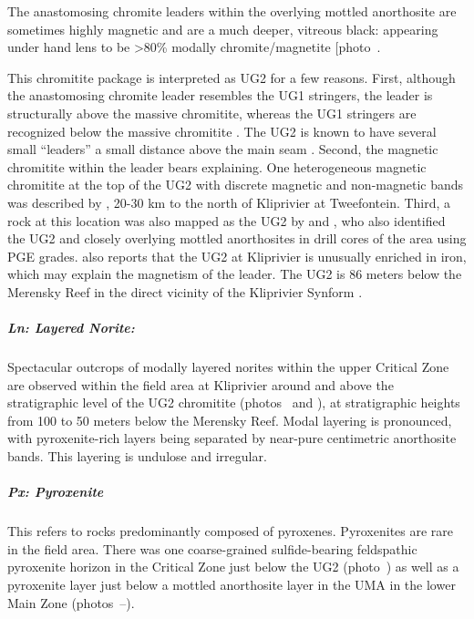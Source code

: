 The anastomosing chromite leaders within the overlying mottled
anorthosite are sometimes highly magnetic and are a much deeper,
vitreous black: appearing under hand lens to be \textgreater80\% modally
chromite/magnetite {[}photo~\ChFivePhoto{65}{]}.

This chromitite package is interpreted as UG2 for a few reasons. First,
although the anastomosing chromite leader resembles the UG1 stringers,
the leader is structurally above the massive chromitite, whereas the UG1
stringers are recognized below the massive chromitite \citep{voordouw2009,mukherjee2017}. The UG2 is known to have several small
``leaders'' a small distance above the main seam \citep{maier2024}. Second, the magnetic chromitite within the leader bears
explaining. One heterogeneous magnetic chromitite at the top of the UG2
with discrete magnetic and non-magnetic bands was described by
\citet{frankel1942}, 20-30 km to the north of Kliprivier at Tweefontein.
Third, a rock at this location was also mapped as the UG2 by \citet[Fig.~4]{harmer1985} and \citet[Fig.~3]{vandermerwe2007}, who also
identified the UG2 and closely overlying mottled anorthosites in drill
cores of the area using PGE grades. \citet{vandermerwe2007} also reports
that the UG2 at Kliprivier is unusually enriched in iron, which may
explain the magnetism of the leader. The UG2 is 86 meters below the
Merensky Reef in the direct vicinity of the Kliprivier Synform \citep[Borehole~3:][]{vandermerwe2007}.

\subparagraph{Ln: Layered Norite:}
\label{sec:ch5-unit-ln}

Spectacular outcrops of modally layered norites within the upper
Critical Zone are observed within the field area at Kliprivier around
and above the stratigraphic level of the UG2 chromitite (photos~ and
), at stratigraphic heights from 100 to 50 meters below the Merensky
Reef. Modal layering is pronounced, with pyroxenite-rich layers being
separated by near-pure centimetric anorthosite bands. This layering is
undulose and irregular.

\subparagraph{Px: Pyroxenite}
\label{sec:ch5-unit-px}

This refers to rocks predominantly composed of pyroxenes. Pyroxenites
are rare in the field area. There was one coarse-grained sulfide-bearing
feldspathic pyroxenite horizon in the Critical Zone just below the UG2
(photo~) as well as a pyroxenite layer just below a mottled
anorthosite layer in the UMA in the lower Main Zone (photos~--).

